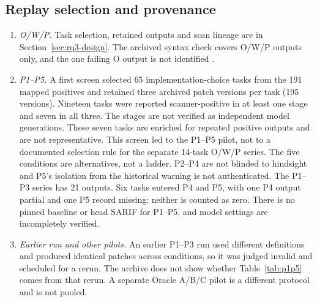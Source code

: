\subsection*{Replay selection and provenance}
\begin{enumerate}\setlength{\itemsep}{1pt}
\item \emph{O/W/P.} Task selection, retained outputs and scan lineage are in Section~\ref{sec:rq3-design}. The archived syntax check covers O/W/P outputs only, and the one failing O output is not identified \unverified.
\item \emph{P1--P5.} A first screen selected 65 implementation-choice tasks from the 191 mapped positives and retained three archived patch versions per task (195 versions). Nineteen tasks were reported scanner-positive in at least one stage and seven in all three. The stages are not verified as independent model generations. These seven tasks are enriched for repeated positive outputs and are not representative. This screen led to the P1--P5 pilot, not to a documented selection rule for the separate 14-task O/W/P series. The five conditions are alternatives, not a ladder. P2--P4 are not blinded to hindsight and P5's isolation from the historical warning is not authenticated. The P1--P3 series has 21 outputs. Six tasks entered P4 and P5, with one P4 output partial and one P5 record missing; neither is counted as zero. There is no pinned baseline or head SARIF for P1--P5, and model settings are incompletely verified.
\item \emph{Earlier run and other pilots.} An earlier P1--P3 run used different definitions and produced identical patches across conditions, so it was judged invalid and scheduled for a rerun. The archive does not show whether Table~\ref{tab:p1p5} comes from that rerun. A separate Oracle A/B/C pilot is a different protocol and is not pooled.
\end{enumerate}


